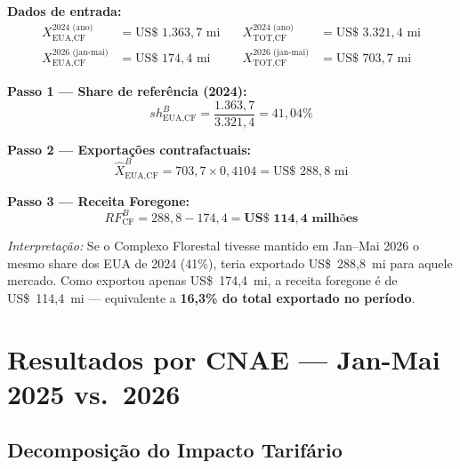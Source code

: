 \documentclass[12pt, a4paper]{article}
\begin{document}
\begin{exemplobox}
\small
\textbf{Dados de entrada:}
\begin{align*}
  X_{\text{EUA},\text{CF}}^{2024\text{ (ano)} } &= \text{US\$~}1{.}363{,}7 \text{ mi}
  &\quad X_{\text{TOT},\text{CF}}^{2024\text{ (ano)} } &= \text{US\$~}3{.}321{,}4 \text{ mi} \\
  X_{\text{EUA},\text{CF}}^{2026\text{ (jan-mai)}} &= \text{US\$~}174{,}4 \text{ mi}
  &\quad X_{\text{TOT},\text{CF}}^{2026\text{ (jan-mai)}} &= \text{US\$~}703{,}7 \text{ mi}
\end{align*}

\textbf{Passo 1 --- Share de referência (2024):}
\[
  sh_{\text{EUA},\text{CF}}^{B}
    = \frac{1{.}363{,}7}{3{.}321{,}4}
    = 41{,}04\%
\]

\textbf{Passo 2 --- Exportações contrafactuais:}
\[
  \hat{X}_{\text{EUA},\text{CF}}^{B}
    = 703{,}7 \times 0{,}4104
    = \text{US\$~} 288{,}8 \text{ mi}
\]

\textbf{Passo 3 --- Receita Foregone:}
\[
  RF_{\text{CF}}^{B}
    = 288{,}8 - 174{,}4
    = \mathbf{\text{US\$~} 114{,}4 \text{ milhões}}
\]

\medskip
\noindent\textit{Interpretação:} Se o Complexo Florestal tivesse mantido
em Jan--Mai 2026 o mesmo share dos EUA de 2024 (41\%), teria exportado
US\$~288,8~mi para aquele mercado.
Como exportou apenas US\$~174,4~mi, a receita foregone é de
US\$~114,4~mi --- equivalente a
\textbf{16,3\% do total exportado no período}.
\end{exemplobox}

\section{Resultados por CNAE --- Jan-Mai 2025 vs.\ 2026}
\label{sec:resultados}

\subsection{Decomposição do Impacto Tarifário}
\end{document}
